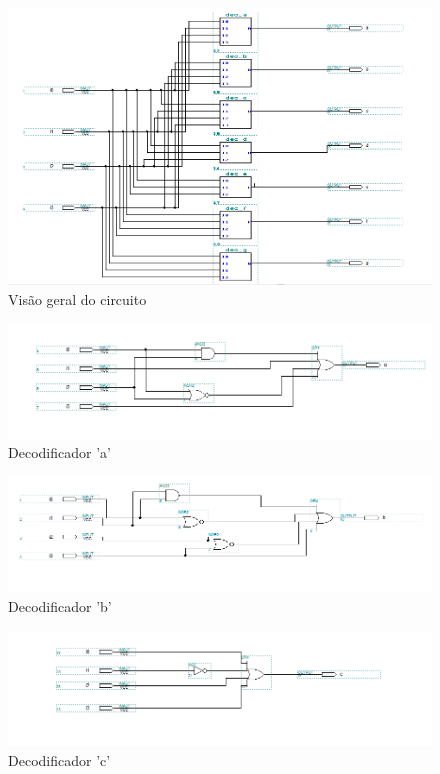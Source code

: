 \documentclass[a4paper]{article}
\begin{document}
\begin{figure}[h!]
  \centering
  \includegraphics[scale=0.7]{dec_4-7.png}
  \caption{Visão geral do circuito}
\end{figure}


\begin{figure}[h!]
  \centering
  \includegraphics[scale=0.7]{dec_a.png}
  \caption{Decodificador 'a'}
\end{figure}

\begin{figure}[h!]
  \centering
  \includegraphics[scale=0.7]{dec_b.png}
  \caption{Decodificador 'b'}
\end{figure}

\begin{figure}[h!]
  \centering
  \includegraphics[scale=0.7]{dec_c.png}
  \caption{Decodificador 'c'}
\end{figure}
\end{document}
